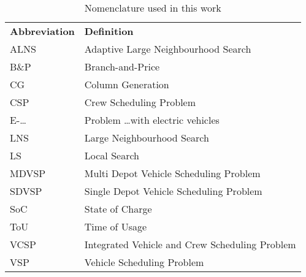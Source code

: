 \documentclass[ht]{article}
\begin{document}
\begin{table}[h]
  \centering
  \begin{tabular}{ll}
    \toprule
    \multicolumn{1}{l}{\textbf{Abbreviation}} & \multicolumn{1}{l}{\textbf{Definition}} \\ 
    \cmidrule(lr){1-1}\cmidrule(lr){2-2}
    ALNS & Adaptive Large Neighbourhood Search \\
    B\&P & Branch-and-Price \\
    CG & Column Generation \\
    CSP & Crew Scheduling Problem \\
    E-\dots & Problem \dots with electric vehicles \\
    LNS & Large Neighbourhood Search \\ 
    LS & Local Search \\
    MDVSP & Multi Depot Vehicle Scheduling Problem \\
    SDVSP & Single Depot Vehicle Scheduling Problem \\ 
    SoC & State of Charge \\
    ToU & Time of Usage \\
    VCSP & Integrated Vehicle and Crew Scheduling Problem \\
    VSP & Vehicle Scheduling Problem \\
    \bottomrule
  \end{tabular}
  \caption{Nomenclature used in this work}
\end{table}
\end{document}
